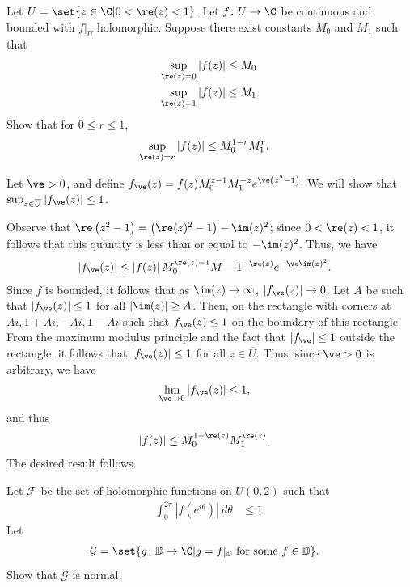 \documentclass[10pt]{mypackage}
\renewcommand{\D}{\mathbb{D}}
\begin{document}
\begin{problem}[Problem 4]
  Let $U = \set{z\in \C | 0 < \re(z) < 1}$. Let $f\colon U\rightarrow \C$ be continuous and bounded with $f|_{U}$ holomorphic. Suppose there exist constants $M_0$ and $M_1$ such that
  \begin{align*}
    \sup_{\re(z) = 0} \left\vert f(z) \right\vert &\leq M_0\\
    \sup_{\re(z) = 1}\left\vert f(z) \right\vert &\leq M_1.
  \end{align*}
  Show that for $0 \leq r \leq 1$,
  \begin{align*}
    \sup_{\re(z)  =r} \left\vert f(z) \right\vert &\leq M_0^{1-r}M_1^{r}.
  \end{align*}
\end{problem}
\begin{solution}
  Let $\ve > 0$, and define $f_{\ve}(z) = f(z)M_0^{z-1}M_1^{-z}e^{\ve\left( z^2-1 \right)}$. We will show that $\sup_{z\in \overline{U}}\left\vert f_{\ve}(z) \right\vert\leq 1$.%

  Observe that $\re\left( z^2 - 1 \right) = \left( \re(z)^2-1 \right)-\im(z)^2$; since $0 < \re(z) < 1$, it follows that this quantity is less than or equal to $-\im(z)^2$. Thus, we have
  \begin{align*}
    \left\vert f_{\ve}(z) \right\vert &\leq \left\vert f(z) \right\vert M_0^{\re(z)-1}M-1^{-\re(z)}e^{-\ve\im(z)^2}.
  \end{align*}
  Since $f$ is bounded, it follows that as $\im(z)\rightarrow\infty$, $\left\vert f_{\ve}(z) \right\vert\rightarrow 0$. Let $A$ be such that $\left\vert f_{\ve}(z) \right\vert\leq 1$ for all $\left\vert \im(z) \right\vert \geq A$. Then, on the rectangle with corners at $Ai,1+Ai,-Ai,1-Ai$ such that $f_{\ve}(z)\leq 1$ on the boundary of this rectangle. From the maximum modulus principle and the fact that $\left\vert f_{\ve} \right\vert\leq 1$ outside the rectangle, it follows that $\left\vert f_{\ve}(z) \right\vert\leq 1$ for all $z\in \overline{U}$. Thus, since $\ve > 0$ is arbitrary, we have
  \begin{align*}
    \lim_{\ve\rightarrow 0} \left\vert f_{\ve}(z) \right\vert &\leq 1,
  \end{align*}
  and thus
  \begin{align*}
    \left\vert f(z) \right\vert &\leq M_0^{1-\re(z)}M_1^{\re(z)}.
  \end{align*}
  The desired result follows.
\end{solution}
\begin{problem}[Problem 5]
  Let $\mathcal{F}$ be the set of holomorphic functions on $U\left( 0,2 \right)$ such that 
  \begin{align*}
    \int_{0}^{2\pi} \left\vert f\left( e^{i\theta} \right) \right\vert\:d\theta &\leq 1.
  \end{align*}
  Let
  \begin{align*}
    \mathcal{G} &= \set{g\colon \D\rightarrow \C | g = f|_{\D}\text{ for some }f\in \D}.
  \end{align*}
  Show that $\mathcal{G}$ is normal.
\end{problem}
\end{document}
